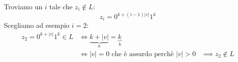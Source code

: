 \documentclass[a4paper]{article}
\begin{document}
\begin{example}
  \vspace{1em}
  \noindent
  Troviamo un \( i \) tale che \( z_i \notin L \):
  \[
    z_i = 0^{k + (i-1)|v|} 1^k
  \] 
  Scegliamo ad esempio \( i = 2 \):
  \[
    \begin{aligned}
      z_2 = 0^{k + |v|} 1^k \in L &\iff \underbrace{k + |v|}_a = \underbrace{k}_b\\
                                  &\iff |v| = 0 \text{ che è assurdo perchè } |v| > 0
                                  &\implies z_2 \notin L
    \end{aligned}
  \] 
\end{example}
\end{document}
